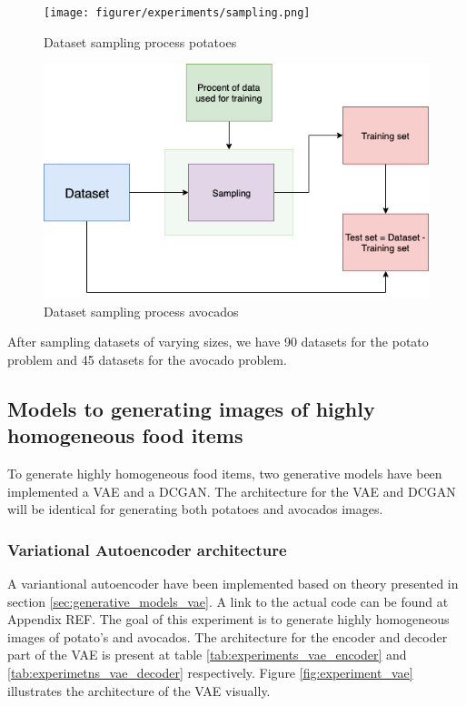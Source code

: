 \documentclass[11pt]{article}
\begin{document}
\begin{figure}[!h]
    \centering
    \texttt{[image: figurer/experiments/sampling.png]}
    \caption{Dataset sampling process potatoes}
    \label{fig:experimetns_sampling_potato}
\end{figure}

\begin{figure}[!h]
    \centering
    \includegraphics[scale=0.5]{figurer/experiments/avocado_sampling.png}
    \caption{Dataset sampling process avocados}
    \label{fig:experiments_sampling_avocado}
\end{figure}

After sampling datasets of varying sizes, we have 90 datasets for the potato problem and 45 datasets for the avocado problem.


\subsection{Models to generating images of highly homogeneous food items}

To generate highly homogeneous food items, two generative models have been implemented a VAE and a DCGAN. The architecture for the VAE and DCGAN will be identical for generating both potatoes and avocados images.

\subsubsection{Variational Autoencoder architecture}

A variantional autoencoder have been implemented based on theory presented in section \ref{sec:generative_models_vae}. A link to the actual code can be found at Appendix REF. The goal of this experiment is to generate highly homogeneous images of potato's and avocados. The architecture for the encoder and decoder part of the VAE is present at table \ref{tab:experiments_vae_encoder} and \ref{tab:experimetns_vae_decoder} respectively. Figure \ref{fig:experiment_vae} illustrates the architecture of the VAE visually. 
\end{document}
